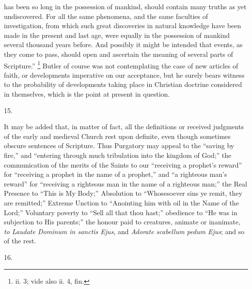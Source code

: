has been so long in the possession of mankind, should
contain many truths as yet undiscovered. For all the same
phenomena, and the same faculties of investigation, from
which such great discoveries in natural knowledge have
been made in the present and last age, were equally in
the possession of mankind several thousand years before.
And possibly it might be intended that events, as they
come to pass, should open and ascertain the meaning of
several parts of Scripture.'' \footnote{ii. 3; vide also ii. 4, fin.} Butler of course was not
contemplating the case of new articles of faith, or
developments imperative on our acceptance, but he surely
bears witness to the probability of developments taking
place in Christian doctrine considered in themselves,
which is the point at present in question.

15.

It may be added that, in matter of fact, all the
definitions or received judgments of the early and
medieval Church rest upon definite, even though sometimes
obscure sentences of Scripture. Thus Purgatory may appeal
to the ``saving by fire,'' and ``entering
through much tribulation into the kingdom of God;''
the communication of the merits of the Saints to our
``receiving a prophet's reward'' for
``receiving a prophet in the name of a prophet,''
and ``a righteous man's reward'' for
``receiving a righteous man in the name of a
righteous man;'' the Real Presence to ``This is
My Body;'' Absolution to ``Whosesoever sins ye
remit, they are remitted;'' Extreme Unction to
``Anointing him with oil in the Name of the
Lord;'' Voluntary poverty to ``Sell all that thou
hast;'' obedience to ``He was in subjection to
His parents;'' the honour paid to creatures, animate
or inanimate, \emph{to Laudate Dominum in sanctis Ejus},
and \emph{Adorate scabellum pedum Ejus}; and so of the
rest.

16.

